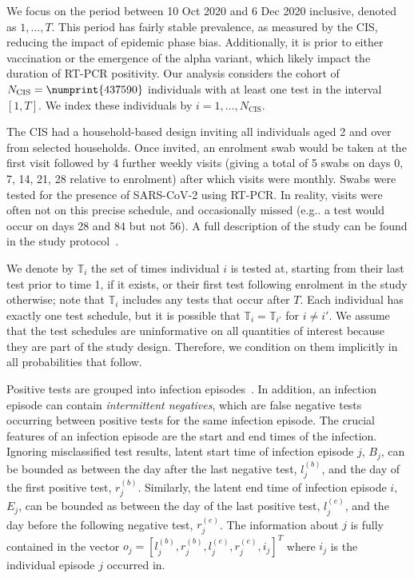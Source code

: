 \documentclass[12pt]{article}
\makeatletter
\newcommand{\Ncis}{N_\text{CIS}}
\newcommand{\sched}{\mathbb{T}}
\DeclareRobustCommand\onedot{\futurelet\@let@token\@onedot}
\def\@onedot{\ifx\@let@token.\else.\null\fi\xspace}
\def\eg{e.g\onedot} \def\Eg{{E.g}\onedot}
\makeatother
\begin{document}
We focus on the period between 10 Oct 2020 and 6 Dec 2020 inclusive, denoted as $1, \dots, T$.
This period has fairly stable prevalence, as measured by the CIS, reducing the impact of epidemic phase bias.
Additionally, it is prior to either vaccination or the emergence of the alpha variant, which likely impact the duration of RT-PCR positivity.
Our analysis considers the cohort of $\Ncis = \numprint{437590}$ individuals with at least one test in the interval $[1, T]$.
We index these individuals by $i = 1, \dots, \Ncis$.

The CIS had a household-based design inviting all individuals aged 2 and over from selected households.
Once invited, an enrolment swab would be taken at the first visit followed by 4 further weekly visits (giving a total of 5 swabs on days 0, 7, 14, 21, 28 relative to enrolment) after which visits were monthly.
Swabs were tested for the presence of SARS-CoV-2 using RT-PCR.
In reality, visits were often not on this precise schedule, and occasionally missed (\eg a test would occur on days 28 and 84 but not 56).
A full description of the study can be found in the study protocol~\citep{cisProtocol}.

We denote by $\sched_i$ the set of times individual $i$ is tested at, starting from their last test prior to time 1, if it exists, or their first test following enrolment in the study otherwise; note that $\sched_i$ includes any tests that occur after $T$.
Each individual has exactly one test schedule, but it is possible that $\sched_i = \sched_{i'}$ for $i \neq i'$.
We assume that the test schedules are uninformative on all quantities of interest because they are part of the study design.
Therefore, we condition on them implicitly in all probabilities that follow.


Positive tests are grouped into infection episodes~\citep{weiRisk}.
In addition, an infection episode can contain \emph{intermittent negatives}, which are false negative tests occurring between positive tests for the same infection episode.
The crucial features of an infection episode are the start and end times of the infection.
Ignoring misclassified test results, latent start time of infection episode $j$, $B_j$, can be bounded as between the day after the last negative test, $l_j^{(b)}$, and the day of the first positive test, $r_j^{(b)}$.
Similarly, the latent end time of infection episode $i$, $E_j$, can be bounded as between the day of the last positive test, $l_j^{(e)}$, and the day before the following negative test, $r_j^{(e)}$.
The information about $j$ is fully contained in the vector $o_j = [l_j^{(b)}, r_j^{(b)}, l_j^{(e)}, r_j^{(e)}, i_j]^T$ where $i_j$ is the individual episode $j$ occurred in.
\end{document}
